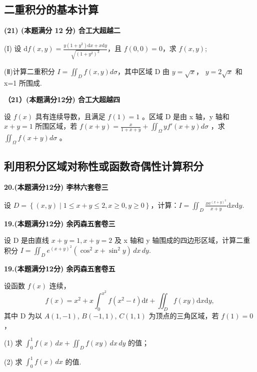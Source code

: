 \documentclass[a4paper,12pt]{article}
\begin{document}
\subsection{二重积分的基本计算}

\textbf{(21) (本题满分 12 分) 合工大超越二}

(I) 设 $\mathrm{d}f(x,y)=\frac{y(1+y^{2})\mathrm{d}x+x\mathrm{d}y}{\sqrt{(1+y^{2})^{3}}}$，且 $f(0,0)=0$，求 $f(x,y)$;

(Ⅱ)计算二重积分 $I=\iint_{D}f(x,y)d\sigma$，其中区域 D 由 $y=\sqrt{x}$， $y=2\sqrt{x}$ 和 x=1 所围成.

\vspace{0.5cm}

\textbf{（21）(本题满分12分) 合工大超越四}

设 $f(x)$ 具有连续导数，且满足 $f(1)=1$ 。区域 D 是由 x 轴，y 轴和 $x+y=1$ 所围区域，若 $f(x+y)=\frac{x}{1+x+y}+\iint_{\Omega}y f'(x+y)d\sigma$ ，求 $\iint_{\Omega}f(x+y)d\sigma$ 。

\subsection{利用积分区域对称性或函数奇偶性计算积分}

\textbf{20.(本题满分12分) 李林六套卷三}

设 $D=\left\{(x,y)\mid1\leqslant x+y\leqslant2,x\geqslant0,y\geqslant0\right\}$，计算：$I=\iint_{D}\frac{x\mathrm{e}^{(x+y)^{2}}}{x+y}\mathrm{d}x\mathrm{d}y.$

\vspace{0.5cm}

\textbf{19.(本题满分12分) 余丙森五套卷三}

设 D 是由直线 $x + y = 1, x + y = 2$ 及 x 轴和 y 轴围成的四边形区域，计算二重积分 $I = \iint_{D} e^{(x + y)^{2}} (\cos^{2} x + \sin^{2} y) \, dx \, dy.$

\vspace{0.5cm}

\textbf{19.(本题满分12分) 余丙森五套卷五}

设函数 $f(x)$ 连续，
\[ f(x)=x^{2}+x\int_{0}^{x^{2}}f(x^{2}-t)\mathrm{d}t+\iint_{D}f(xy)\mathrm{d}x\mathrm{d}y, \]
其中 D 为以 $A(1,-1)$, $B(-1,1)$, $C(1,1)$ 为顶点的三角区域，若 $f(1)=0$，

(1) 求 $\int_{0}^{1} f(x) \, dx + \iint_{D} f(xy) \, dx \, dy$ 的值；

(2) 求 $\int_{0}^{1} f(x) \, dx$ 的值.

\vspace{0.5cm}
\end{document}

